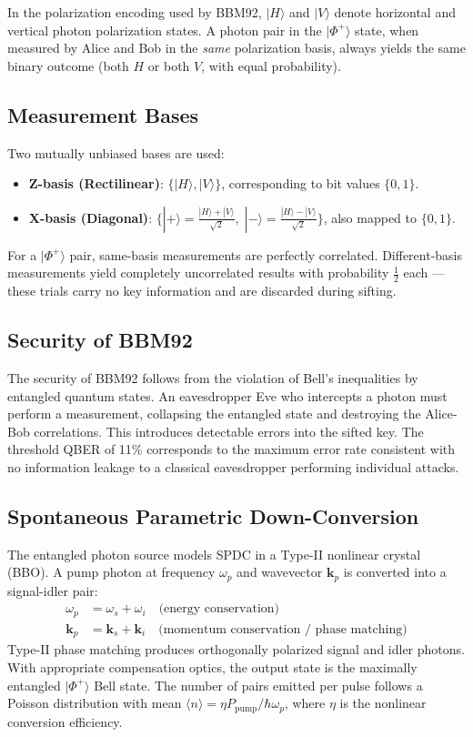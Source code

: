\documentclass[12pt,oneside,letterpaper,english]{article}
\begin{document}
In the polarization encoding used by BBM92, $|H\rangle$ and $|V\rangle$ denote horizontal and vertical photon polarization states. A photon pair in the $|\Phi^+\rangle$ state, when measured by Alice and Bob in the \emph{same} polarization basis, always yields the same binary outcome (both $H$ or both $V$, with equal probability).

\subsection{Measurement Bases}

Two mutually unbiased bases are used:
\begin{itemize}
    \item \textbf{Z-basis (Rectilinear)}: $\{|H\rangle, |V\rangle\}$, corresponding to bit values $\{0, 1\}$.
    \item \textbf{X-basis (Diagonal)}: $\{|+\rangle = \frac{|H\rangle + |V\rangle}{\sqrt{2}},\; |-\rangle = \frac{|H\rangle - |V\rangle}{\sqrt{2}}\}$, also mapped to $\{0, 1\}$.
\end{itemize}

For a $|\Phi^+\rangle$ pair, same-basis measurements are perfectly correlated. Different-basis measurements yield completely uncorrelated results with probability $\frac{1}{2}$ each — these trials carry no key information and are discarded during sifting.

\subsection{Security of BBM92}

The security of BBM92 follows from the violation of Bell's inequalities by entangled quantum states. An eavesdropper Eve who intercepts a photon must perform a measurement, collapsing the entangled state and destroying the Alice-Bob correlations. This introduces detectable errors into the sifted key. The threshold QBER of 11\% corresponds to the maximum error rate consistent with no information leakage to a classical eavesdropper performing individual attacks.

\subsection{Spontaneous Parametric Down-Conversion}

The entangled photon source models SPDC in a Type-II nonlinear crystal (BBO). A pump photon at frequency $\omega_p$ and wavevector $\mathbf{k}_p$ is converted into a signal-idler pair:
\begin{align}
    \omega_p &= \omega_s + \omega_i \quad \text{(energy conservation)} \\
    \mathbf{k}_p &= \mathbf{k}_s + \mathbf{k}_i \quad \text{(momentum conservation / phase matching)}
\end{align}
Type-II phase matching produces orthogonally polarized signal and idler photons. With appropriate compensation optics, the output state is the maximally entangled $|\Phi^+\rangle$ Bell state. The number of pairs emitted per pulse follows a Poisson distribution with mean $\langle n \rangle = \eta P_{\text{pump}} / \hbar\omega_p$, where $\eta$ is the nonlinear conversion efficiency.
\end{document}
